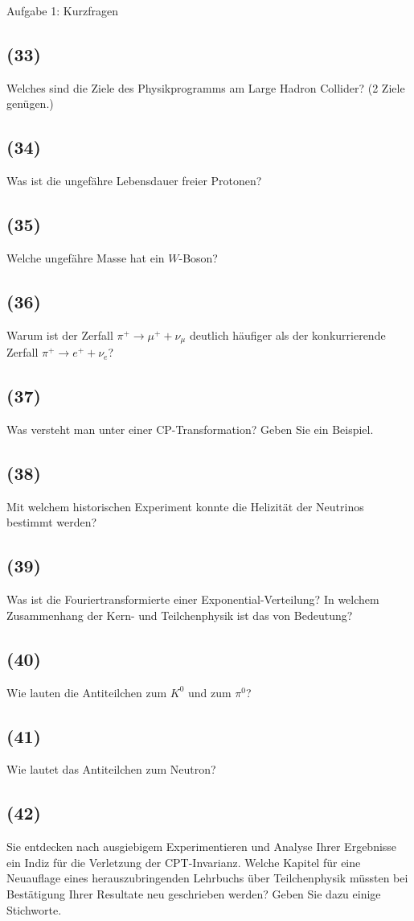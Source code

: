 \begin{aufgabe}{Aufgabe 1: Kurzfragen}
    \subsection{(33)}
    Welches sind die Ziele des Physikprogramms am Large Hadron Collider?
    (2 Ziele genügen.)

    \subsection{(34)}
    Was ist die ungefähre Lebensdauer freier Protonen?

    \subsection{(35)}
    Welche ungefähre Masse hat ein $W$-Boson?

    \subsection{(36)}
    Warum ist der Zerfall $\pi^+ \to \mu^+ + \nu_\mu$ deutlich häufiger als der konkurrierende Zerfall $\pi^+ \to e^+ + \nu_e$?

    \subsection{(37)}
    Was versteht man unter einer CP-Transformation? Geben Sie ein Beispiel.

    \subsection{(38)}
    Mit welchem historischen Experiment konnte die Helizität der Neutrinos bestimmt werden?

    \subsection{(39)}
    Was ist die Fouriertransformierte einer Exponential-Verteilung?
    In welchem Zusammenhang der Kern- und Teilchenphysik ist das von Bedeutung?

    \subsection{(40)}
    Wie lauten die Antiteilchen zum $K^0$ und zum $\pi^0$?

    \subsection{(41)}
    Wie lautet das Antiteilchen zum Neutron?

    \subsection{(42)}
    Sie entdecken nach ausgiebigem Experimentieren und Analyse Ihrer Ergebnisse ein Indiz für die Verletzung der CPT-Invarianz.
    Welche Kapitel für eine Neuauflage eines herauszubringenden Lehrbuchs über Teilchenphysik müssten bei Bestätigung Ihrer Resultate neu geschrieben werden?
    Geben Sie dazu einige Stichworte.
\end{aufgabe}

